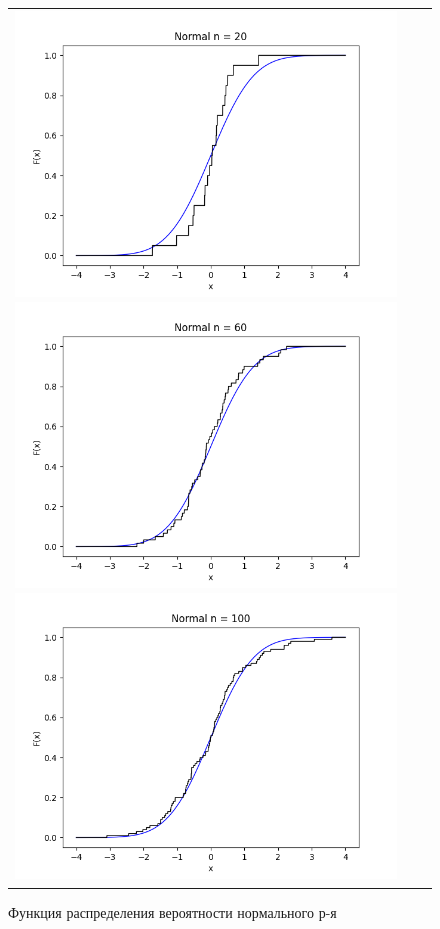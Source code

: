 \begin{figure}[H]
	\begin{tabular}{ccc}
		\includegraphics[scale=0.33]{normal_F20.png}
		\includegraphics[scale=0.33]{normal_F60.png}
		\includegraphics[scale=0.33]{normal_F100.png}
	\end{tabular}
	\caption{Функция распределения вероятности нормального р-я}
\end{figure}

